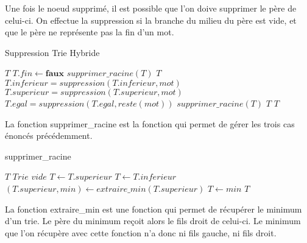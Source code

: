 \documentclass[11pt]{report} %
\begin{document}
Une fois le noeud supprimé, il est possible que l'on doive supprimer le père de celui-ci. On effectue la suppression si la branche du milieu du père est vide, et que le père ne représente pas la fin d'un mot.
\begin{algorithm}
  \caption{Suppression Trie Hybride}
  \begin{algorithmic}[1]
     $T$
    \EndIf
    \State $T.fin \gets \textbf{faux}$  
     $supprimer\_racine(T)$
    \Else
     $T$
    \EndIf
    \State $T.inferieur=suppression(T.inferieur,mot)$
    \State $T.superieur=suppression(T.superieur,mot)$
    \Else
    \State $T.egal=suppression(T.egal,reste(mot))$
     $supprimer\_racine(T)$
    \Else
     $T$
    \EndIf
    \EndIf
     $T$
    \EndFunction
  \end{algorithmic}
\end{algorithm}

La fonction supprimer\_racine est la fonction qui permet de gérer les trois cas énoncés précédemment.

\begin{algorithm}
  \caption{supprimer\_racine}
  \begin{algorithmic}[1]
     $T$
     $Trie$ $vide$
    \State $T \gets T.superieur$ 
    \State $T \gets T.inferieur$ 
    \Else {}
    \State $(T.superieur,min) \gets extraire\_min(T.superieur)$
    \State $T \gets min$
    \EndIf
     $T$
    \EndFunction
  \end{algorithmic}
\end{algorithm}

La fonction extraire\_min est une fonction qui permet de récupérer le minimum d'un trie. Le père du minimum reçoit alors le fils droit de celui-ci. Le minimum que l'on récupère avec cette fonction n'a donc ni fils gauche, ni fils droit.
\end{document}
